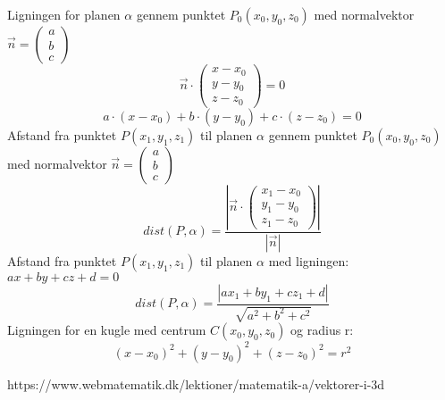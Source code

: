 Ligningen for planen $\alpha$ gennem punktet $P_0 (x_0,y_0,z_0)$ med normalvektor $\vec{n}=\begin{pmatrix}a\\b\\c\end{pmatrix}$
$$\vec{n}\cdot\begin{pmatrix}x-x_0\\y-y_0 \\z-z_0\end{pmatrix}=0$$
$$a\cdot(x-x_0)+b\cdot(y-y_0)+c\cdot(z-z_0)=0$$
Afstand fra punktet $P(x_1,y_1,z_1)$ til planen $\alpha$ gennem punktet $P_0 (x_0,y_0,z_0)$ med normalvektor $\vec{n}=\begin{pmatrix}a\\b\\c\end{pmatrix}$
$$dist(P,\alpha)=\frac{\left| \vec{n}\cdot\begin{pmatrix}x_1-x_0\\y_1-y_0\\z_1-z_0\end{pmatrix} \right|}{\left|  \vec{n}\right|}$$
Afstand fra punktet $P(x_1,y_1,z_1)$ til planen $\alpha$ med ligningen: $ax+by+cz+d=0$
$$dist(P,\alpha)=\frac{\left|ax_1+by_1+cz_1+d  \right|}{\sqrt{a^2+b^2+c^2}}$$
Ligningen for en kugle med centrum $C(x_0,y_0,z_0)$ og radius r:
$$(x-x_0)^2+(y-y_0)^2+(z-z_0)^2=r^2$$


https://www.webmatematik.dk/lektioner/matematik-a/vektorer-i-3d